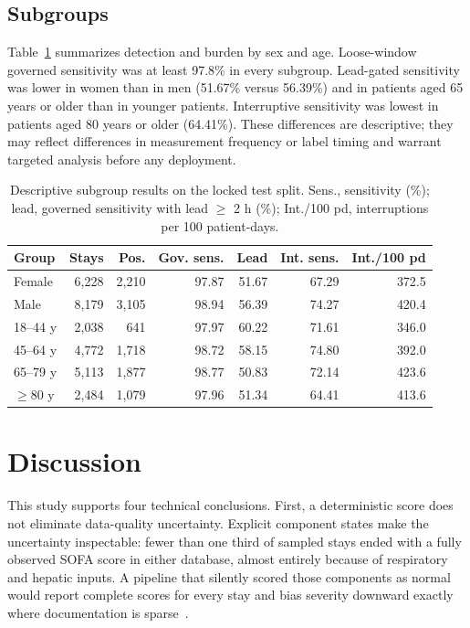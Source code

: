 \documentclass[journal]{IEEEtran}
\begin{document}
\subsection{Subgroups}

Table~\ref{tab:subgroups} summarizes detection and burden by sex and age.
Loose-window governed sensitivity was at least 97.8\% in every subgroup.
Lead-gated sensitivity was lower in women than in men (51.67\% versus
56.39\%) and in patients aged 65 years or older than in younger patients.
Interruptive sensitivity was lowest in patients aged 80 years or older
(64.41\%). These differences are descriptive; they may reflect differences in
measurement frequency or label timing and warrant targeted analysis before
any deployment.

\begin{table}[t]
\centering
\caption{Descriptive subgroup results on the locked test split. Sens.,
sensitivity (\%); lead, governed sensitivity with lead $\geq$ 2 h (\%);
Int./100 pd, interruptions per 100 patient-days.}
\label{tab:subgroups}
\footnotesize
\setlength{\tabcolsep}{2.5pt}
\begin{tabular}{@{}lrrrrrr@{}}
\toprule
Group & Stays & Pos. & Gov. sens. & Lead & Int. sens. & Int./100 pd \\
\midrule
Female & 6,228 & 2,210 & 97.87 & 51.67 & 67.29 & 372.5 \\
Male & 8,179 & 3,105 & 98.94 & 56.39 & 74.27 & 420.4 \\
18--44 y & 2,038 & 641 & 97.97 & 60.22 & 71.61 & 346.0 \\
45--64 y & 4,772 & 1,718 & 98.72 & 58.15 & 74.80 & 392.0 \\
65--79 y & 5,113 & 1,877 & 98.77 & 50.83 & 72.14 & 423.6 \\
$\geq$80 y & 2,484 & 1,079 & 97.96 & 51.34 & 64.41 & 413.6 \\
\bottomrule
\end{tabular}
\end{table}

\section{Discussion}

This study supports four technical conclusions. First, a deterministic score
does not eliminate data-quality uncertainty. Explicit component states make
the uncertainty inspectable: fewer than one third of sampled stays ended with
a fully observed SOFA score in either database, almost entirely because of
respiratory and hepatic inputs. A pipeline that silently scored those
components as normal would report complete scores for every stay and bias
severity downward exactly where documentation is sparse~\cite{lambden2019}.
\end{document}
